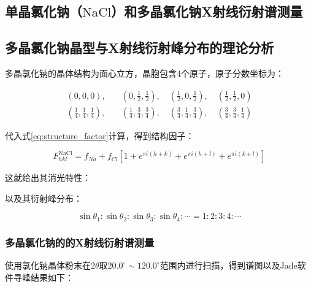 \documentclass{thuemp}
\begin{document}
\subsection{单晶氯化钠（$\text{NaCl}$）和多晶氯化钠X射线衍射谱测量}

\subsection{多晶氯化钠晶型与X射线衍射峰分布的理论分析}

多晶氯化钠的晶体结构为面心立方，晶胞包含4个原子，原子分数坐标为：

\begin{align*}
(0,0,0),\quad &(0,\frac{1}{2},\frac{1}{2}),\quad (\frac{1}{2},0,\frac{1}{2}),\quad (\frac{1}{2},\frac{1}{2},0) \\
(\frac{1}{4},\frac{1}{4},\frac{1}{4}),\quad &(\frac{1}{4},\frac{3}{4},\frac{3}{4}),\quad (\frac{3}{4},\frac{1}{4},\frac{3}{4}),\quad (\frac{3}{4},\frac{3}{4},\frac{1}{4})
\end{align*}

代入式\ref{eq:structure_factor}计算，得到结构因子：

\begin{equation}
    F_{hkl}^{\text{NaCl}} = f_{Na} + f_{Cl} \left[1 + e^{\pi i (h+k)} + e^{\pi i (h+l)} + e^{\pi i (k+l)}\right]
    \label{eq:nacl_struct_fac}
\end{equation}

这就给出其消光特性：

以及其衍射峰分布：

\begin{equation}
    \sin{\theta_1} : \sin{\theta_2} :\sin{\theta_3} : \sin{\theta_4} : \cdots = 1 : 2 : 3 : 4 : \cdots
    \label{eq:nacl_diff_patt}
\end{equation}

\subsubsection{多晶氯化钠的的X射线衍射谱测量}

使用氯化钠晶体粉末在$2\theta$取$20.0^\circ \sim 120.0^\circ$范围内进行扫描，得到谱图以及Jade软件寻峰结果如下：  
\end{document}
